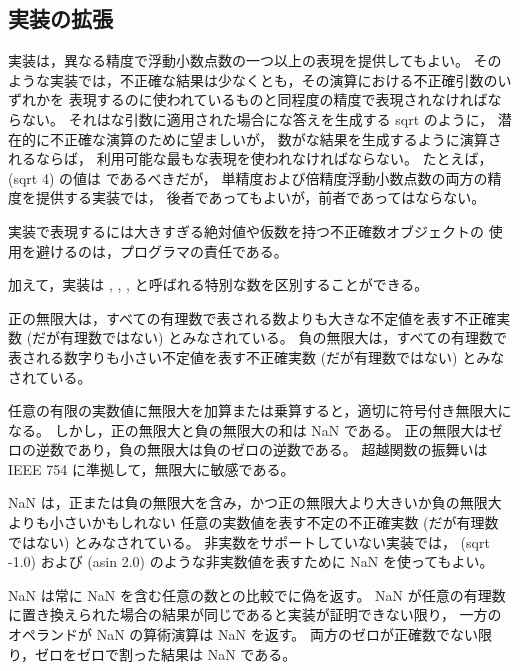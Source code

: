 \subsection{実装の拡張}

\vest 実装は，異なる精度で浮動小数点数の一つ以上の表現を提供してもよい。
そのような実装では，不正確な結果は少なくとも，その演算における不正確引数のいずれかを
表現するのに使われているものと同程度の精度で表現されなければならない。
それはな引数に適用された場合にな答えを生成する {\cf sqrt} のように，
潜在的に不正確な演算のために望ましいが，
数がな結果を生成するように演算されるならば，
利用可能な最もな表現を使われなければならない。
たとえば，{\cf (sqrt 4)} の値は {} であるべきだが，
単精度および倍精度浮動小数点数の両方の精度を提供する実装では，
後者であってもよいが，前者であってはならない。

実装で表現するには大きすぎる絶対値や仮数を持つ不正確数オブジェクトの
使用を避けるのは，プログラマの責任である。

加えて，実装は , , , 
と呼ばれる特別な数を区別することができる。

正の無限大は，すべての有理数で表される数よりも大きな不定値を表す不正確実数 (だが有理数ではない) とみなされている。
負の無限大は，すべての有理数で表される数字りも小さい不定値を表す不正確実数 (だが有理数ではない) とみなされている。

任意の有限の実数値に無限大を加算または乗算すると，適切に符号付き無限大になる。
しかし，正の無限大と負の無限大の和は NaN である。
正の無限大はゼロの逆数であり，負の無限大は負のゼロの逆数である。
超越関数の振舞いは IEEE 754 に準拠して，無限大に敏感である。

NaN は，正または負の無限大を含み，かつ正の無限大より大きいか負の無限大よりも小さいかもしれない
任意の実数値を表す不定の不正確実数 (だが有理数ではない) とみなされている。
非実数をサポートしていない実装では， {\cf (sqrt -1.0)} および {\cf (asin 2.0)}
のような非実数値を表すために NaN を使ってもよい。

NaN は常に NaN を含む任意の数との比較でに偽を返す。
NaN が任意の有理数に置き換えられた場合の結果が同じであると実装が証明できない限り，
一方のオペランドが NaN の算術演算は NaN を返す。
両方のゼロが正確数でない限り，ゼロをゼロで割った結果は NaN である。


